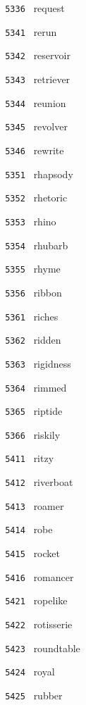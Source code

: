 \documentclass[11pt]{article}
\begin{document}
\begin{multicols}{6}
\noindent \texttt{ 5336 } request  \par
\vspace{3mm}
\noindent \texttt{ 5341 } rerun  \par
\noindent \texttt{ 5342 } reservoir  \par
\noindent \texttt{ 5343 } retriever  \par
\noindent \texttt{ 5344 } reunion  \par
\noindent \texttt{ 5345 } revolver  \par
\noindent \texttt{ 5346 } rewrite  \par
\vspace{3mm}
\noindent \texttt{ 5351 } rhapsody  \par
\noindent \texttt{ 5352 } rhetoric  \par
\noindent \texttt{ 5353 } rhino  \par
\noindent \texttt{ 5354 } rhubarb  \par
\noindent \texttt{ 5355 } rhyme  \par
\noindent \texttt{ 5356 } ribbon  \par
\vspace{3mm}
\noindent \texttt{ 5361 } riches  \par
\noindent \texttt{ 5362 } ridden  \par
\noindent \texttt{ 5363 } rigidness  \par
\noindent \texttt{ 5364 } rimmed  \par
\noindent \texttt{ 5365 } riptide  \par
\noindent \texttt{ 5366 } riskily  \par
\noindent \texttt{ 5411 } ritzy  \par
\noindent \texttt{ 5412 } riverboat  \par
\noindent \texttt{ 5413 } roamer  \par
\noindent \texttt{ 5414 } robe  \par
\noindent \texttt{ 5415 } rocket  \par
\noindent \texttt{ 5416 } romancer  \par
\vspace{3mm}
\noindent \texttt{ 5421 } ropelike  \par
\noindent \texttt{ 5422 } rotisserie  \par
\noindent \texttt{ 5423 } roundtable  \par
\noindent \texttt{ 5424 } royal  \par
\noindent \texttt{ 5425 } rubber  \par

\end{multicols}
\end{document}
